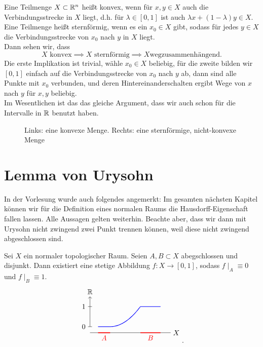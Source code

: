 \begin{dexample}
    Eine Teilmenge $X\subset \mathbb{R}^n$ heißt konvex, wenn für $x,y\in X$ auch die Verbindungsstrecke in $X$ liegt, d.h. für  $λ\in [0,1]$ ist auch $λx + (1-λ)y \in X$. Eine Teilmenge heißt sternförmig, wenn es ein $x_0\in X$ gibt, sodass für jedes $y\in X$ die Verbindungsstrecke von $x_0$ nach $y$ in  $X$ liegt. \\
    Dann sehen wir, dass
    \[
    X \text{ konvex}\implies X \text{ sternförmig} \implies X \text{wegzusammenhängend}
    .\] 
    Die erste Implikation ist trivial, wähle $x_0\in X$ beliebig, für die zweite bilden wir $[0,1]$ einfach auf die Verbindungsstrecke von  $x_0$ nach $y$ ab, dann sind alle Punkte mit  $x_0$ verbunden, und deren Hintereinanderschalten ergibt Wege von $x$ nach  $y$ für  $x,y$ beliebig. \\
    Im Wesentlichen ist das das gleiche Argument, dass wir auch schon für die Intervalle in $\mathbb{R}$ benutzt haben.
\end{dexample}

\begin{figure}[ht]
    \centering
    \caption{Links: eine konvexe Menge. Rechts: eine sternförmige, nicht-konvexe Menge}
    \label{fig:sternförmige-menge}
\end{figure}

\section{Lemma von Urysohn}
\begin{dremark}
    In der Vorlesung wurde auch folgendes angemerkt: Im gesamten nächsten Kapitel können wir für die Definition eines normalen Raums die Hausdorff-Eigenschaft fallen lassen. Alle Aussagen gelten weiterhin. Beachte aber, dass wir dann mit Urysohn nicht zwingend zwei Punkt trennen können, weil diese nicht zwingend abgeschlossen sind.
\end{dremark}

\begin{theorem}\label{thm:urysohn}
    Sei $X$ ein normaler topologischer Raum. Seien  $A,B\subset X$ abegschlossen und disjunkt. Dann existiert eine stetige Abbildung $f: X \to  [0,1]$, sodass $f\mid _A \equiv 0 $ und $f\mid _{B} \equiv  1$.
    \[
\begin{tikzpicture}
    \draw (0,-0.3) -- (4,-0.3) node[anchor=west] {$X$};
    \draw[red,very thick] (0.4,-0.3) -- (1, -0.3) node[midway, anchor = north] {$A$};
    \draw[red, very thick] (2.5,-0.3) -- (3.5, -0.3) node[midway, anchor = north] {$B$};
    \draw[->] (0,0) -- (0,1.5) node[anchor=south] {$\R$};
    \draw (-0.1,0) node[anchor = east] {$0$}-- (0.1,0);
    \draw (-0.1,1) node[anchor=east] {$1$}-- (0.1,1);
    \draw[blue, thick] (0.4,0)-- (1,0);
    \draw[blue, thick] (2.5,1) -- (3.5,1);
    \draw[blue, thick, smooth, domain = 1:2.5,variable=\x] plot ({\x},{(\x-1)^2/2.25});
\end{tikzpicture}
    .\] 
\end{theorem}


